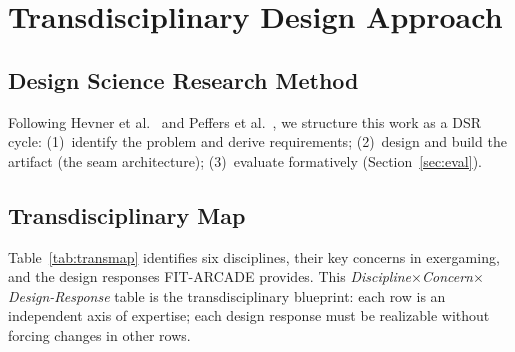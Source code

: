 \documentclass[runningheads]{llncs}
\newcommand{\sys}{\textsc{FIT-ARCADE}}
\begin{document}
\section{Transdisciplinary Design Approach}
\label{sec:approach}

\subsection{Design Science Research Method}

Following Hevner et al.~\cite{hevner2004dsr} and Peffers et al.~\cite{peffers2007dsrm},
we structure this work as a DSR cycle: (1)~identify the problem and derive
requirements; (2)~design and build the artifact (the seam architecture);
(3)~evaluate formatively (Section~\ref{sec:eval}).

\subsection{Transdisciplinary Map}

Table~\ref{tab:transmap} identifies six disciplines, their key concerns in
exergaming, and the design responses \sys{} provides. This
\emph{Discipline$\times$Concern$\times$Design-Response} table is the
transdisciplinary blueprint: each row is an independent axis of expertise; each
design response must be realizable without forcing changes in other rows.
\end{document}
